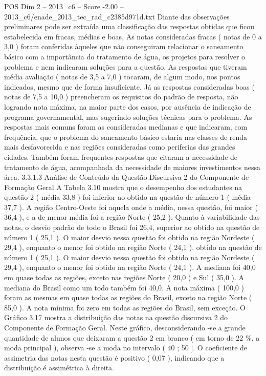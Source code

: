 \begin{textsample}{POS Dim 2 – 2013\_c6 – Score -2.00 – 2013\_c6/enade\_2013\_tec\_rad\_c2385d971d.txt}
Diante das observações preliminares pode ser extraída uma classificação das respostas obtidas que ficou estabelecida em fracas, médias e boas.
As notas consideradas fracas ( notas de 0 a 3,0 ) foram conferidas àqueles que não conseguiram relacionar o saneamento básico com a importância do tratamento de água, os projetos para resolver o problema e nem indicaram soluções para a questão.
As respostas que tiveram média avaliação ( notas de 3,5 a 7,0 ) tocaram, de algum modo, nos pontos indicados, mesmo que de forma insuficiente.
Já as respostas consideradas boas ( notas de 7,5 a 10,0 ) preencheram os requisitos do padrão de resposta, não logrando nota máxima, na maior parte dos casos, por ausência de indicação de programa governamental, mas sugerindo soluções técnicas para o problema.
As respostas mais comuns foram as consideradas medianas e que indicaram, com frequência, que o problema do saneamento básico estaria nas classes de renda mais desfavorecida e nas regiões consideradas como periferias das grandes cidades.
Também foram frequentes respostas que citaram a necessidade de tratamento de água, acompanhada da necessidade de maiores investimentos nessa área. 3.3.1.3 Análise de Conteúdo da Questão Discursiva 2 do Componente de Formação Geral A Tabela 3.10 mostra que o desempenho dos estudantes na questão 2 ( média 33,8 ) foi inferior ao obtido na questão de número 1 ( média 37,7 ).
A região Centro-Oeste foi aquela onde a média, nessa questão, foi maior ( 36,4 ), e a de menor média foi a região Norte ( 25,2 ).
Quanto à variabilidade das notas, o desvio padrão de todo o Brasil foi 26,4, superior ao obtido na questão de número 1 ( 25,1 ).
O maior desvio nessa questão foi obtido na região Nordeste ( 29,4 ), enquanto o menor foi obtido na região Norte ( 24,1 ). obtido na questão de número 1 ( 25,1 ).
O maior desvio nessa questão foi obtido na região Nordeste ( 29,4 ), enquanto o menor foi obtido na região Norte ( 24,1 ).
A mediana foi 40,0 em quase todas as regiões, exceto nas regiões Norte ( 20,0 ) e Sul ( 35,0 ).
A mediana do Brasil como um todo também foi 40,0.
A nota máxima ( 100,0 ) foram as mesmas em quase todas as regiões do Brasil, exceto na região Norte ( 85,0 ).
A nota mínima foi zero em todas as regiões do Brasil, sem exceção.
O Gráfico 3.17 mostra a distribuição das notas na questão discursiva 2 do Componente de Formação Geral.
Neste gráfico, desconsiderando -se a grande quantidade de alunos que deixaram a questão 2 em branco ( em torno de 22 \%, a moda principal ), observa -se a moda no intervalo ( 40 ; 50 ].
O coeficiente de assimetria das notas nesta questão é positivo ( 0,07 ), indicando que a distribuição é assimétrica à direita.

\end{textsample}
